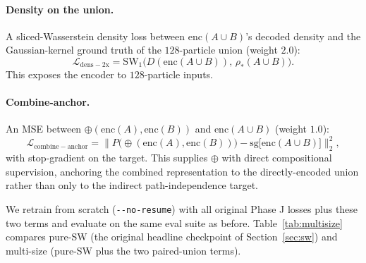 \documentclass[11pt]{article}
\newcommand{\enc}{\mathrm{enc}}
\newcommand{\combine}{\oplus}
\newcommand{\SW}{\mathrm{SW}}
\begin{document}
\paragraph{Density on the union.} A sliced-Wasserstein density loss between $\enc(A \cup B)$'s decoded density and the Gaussian-kernel ground truth of the $128$-particle union (weight $2.0$):
\begin{equation}
  \mathcal{L}_{\mathrm{dens-2x}} = \SW_1\!\big(D(\enc(A \cup B)),\, \rho_*(A \cup B)\big).
\end{equation}
This exposes the encoder to $128$-particle inputs.

\paragraph{Combine-anchor.} An MSE between $\combine(\enc(A), \enc(B))$ and $\enc(A \cup B)$ (weight $1.0$):
\begin{equation}
  \mathcal{L}_{\mathrm{combine-anchor}} = \big\| P\!\big(\combine(\enc(A), \enc(B))\big) - \mathrm{sg}\!\big[\enc(A \cup B)\big] \big\|_2^2,
\end{equation}
with stop-gradient on the target. This supplies $\combine$ with direct compositional supervision, anchoring the combined representation to the directly-encoded union rather than only to the indirect path-independence target.

We retrain from scratch (\verb|--no-resume|) with all original Phase J losses plus these two terms and evaluate on the same eval suite as before. Table~\ref{tab:multisize} compares pure-SW (the original headline checkpoint of Section~\ref{sec:sw}) and multi-size (pure-SW plus the two paired-union terms).
\end{document}
